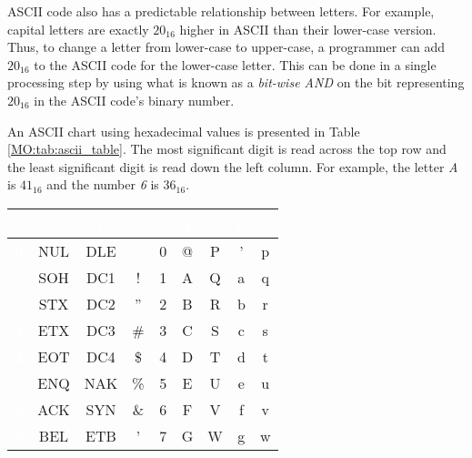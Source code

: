 \ac{ASCII} code also has a predictable relationship between letters. For example, capital letters are exactly $ 20_{16} $ higher in ASCII than their lower-case version. Thus, to change a letter from lower-case to upper-case, a programmer can add $ 20_{16} $ to the \ac{ASCII} code for the lower-case letter. This can be done in a single processing step by using what is known as a \emph{bit-wise \textsf{AND}} on the bit representing $ 20_{16} $ in the \ac{ASCII} code's binary number.

An \ac{ASCII} chart using hexadecimal values is presented in Table \ref{MO:tab:ascii_table}. The most significant digit is read across the top row and the least significant digit is read down the left column. For example, the letter \emph{A} is $ 41_{16} $ and the number \emph{6} is $ 36_{16} $.

\begin{table}[H]
  \sffamily
  \newcommand{\head}[1]{\textcolor{white}{\textbf{#1}}}    
  \begin{center}
    \begin{tabular}{ c c c c c c c c c } 
      \hline
      \rowcolor{black!75}
      & {\head{0}} & {\head{1}} & {\head{2}} & {\head{3}}
      & {\head{4}} & {\head{5}} & {\head{6}} & {\head{7}} \\
      \hline  
      \cellcolor{black!75}\head{0} & {NUL} & {DLE} & {} & {0} & {@} & 
      {P} & {'} & {p} 
      \\
      \cellcolor{black!75}\head{1} & {SOH} & {DC1} & {!} & {1} & {A} & 
      {Q} & {a} & {q} 
      \\
      \cellcolor{black!75}\head{2} & {STX} & {DC2} & {''} & {2} & {B} & 
      {R} & {b} & {r} 
      \\
      \cellcolor{black!75}\head{3} & {ETX} & {DC3} & {\#} & {3} & {C} & 
      {S} & {c} & {s} 
      \\
      \cellcolor{black!75}\head{4} & {EOT} & {DC4} & {\$} & {4} & {D} & 
      {T} & {d} & {t} 
      \\
      \cellcolor{black!75}\head{5} & {ENQ} & {NAK} & {\%} & {5} & {E} & 
      {U} & {e} & {u} 
      \\
      \cellcolor{black!75}\head{6} & {ACK} & {SYN} & {\&} & {6} & {F} & 
      {V} & {f} & {v} 
      \\
      \cellcolor{black!75}\head{7} & {BEL} & {ETB} & {'} & {7} & {G} & 
      {W} & {g} & {w} 
      \\

\end{tabular}
\end{center}
\end{table}
